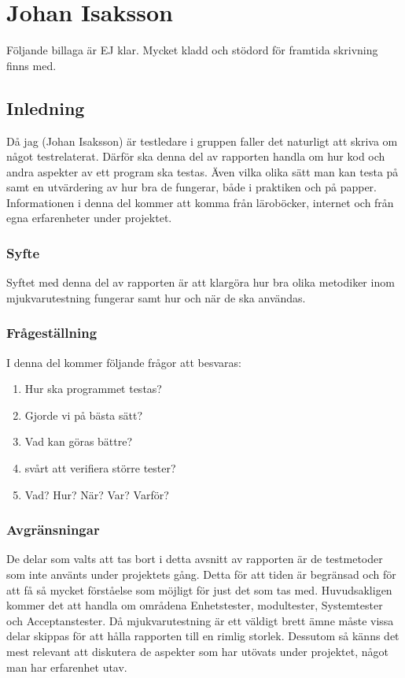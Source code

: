 \section{Johan Isaksson}
	Följande billaga är EJ klar. Mycket kladd och stödord för framtida skrivning finns med.
	\subsection{Inledning}
	Då jag (Johan Isaksson) är testledare i gruppen faller det naturligt att skriva om något testrelaterat. Därför ska denna del av rapporten handla om hur kod och andra aspekter av ett program ska testas. Även vilka olika sätt man kan testa på samt en utvärdering av hur bra de fungerar, både i praktiken och på papper. Informationen i denna del kommer att komma från läroböcker, internet och från egna erfarenheter under projektet. 
	
	
	\subsubsection{Syfte}
	Syftet med denna del av rapporten är att klargöra hur bra olika metodiker inom mjukvarutestning fungerar samt hur och när de ska användas. 
	
	
	\subsubsection{Frågeställning}
	I denna del kommer följande frågor att besvaras:
	\begin{enumerate}
	\item{Hur ska programmet testas?}
	\item{Gjorde vi på bästa sätt?}
	\item{Vad kan göras bättre?}
	\item{svårt att verifiera större tester?}
	\item{Vad? Hur? När? Var? Varför?}	
	\end{enumerate}
	
	\subsubsection{Avgränsningar}
	De delar som valts att tas bort i detta avsnitt av rapporten är de testmetoder som inte använts under projektets gång. Detta för att tiden är begränsad och för att få så mycket förståelse som möjligt för just det som tas med. Huvudsakligen kommer det att handla om områdena Enhetstester, modultester, Systemtester och Acceptanstester. \newline
	Då mjukvarutestning är ett väldigt brett ämne måste vissa delar skippas för att hålla rapporten till en rimlig storlek. Dessutom så känns det mest relevant att diskutera de aspekter som har utövats under projektet, något man har erfarenhet utav.
	
